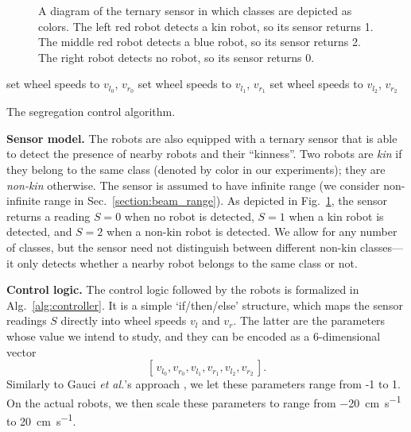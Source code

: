 \documentclass[conference]{IEEEtran}
\newcommand{\myparagraph}[1]{\textbf{#1.}}
\begin{document}
\newcommand{\robot}[2]{%
  \filldraw[draw=#2,fill=#2!20] (#1) circle(5mm);
  \draw[draw=#2,->,-Stealth,rotate around={0:(#1)}] (#1) -- +(5mm,0);
  \fill[fill=gray!20] ($(#1)+(5mm,0)$) -- +( 45:1cm) -- +(-45:1cm) -- cycle;%
  \fill[fill=#2] ($(#1)+(5mm,0)$) circle (1mm);%
}
\begin{figure}[t]
  \centering
  \caption{A diagram of the ternary sensor in which classes are depicted
    as colors. The left red robot detects a kin robot, so its sensor
    returns 1. The middle red robot detects a blue robot, so its sensor
    returns 2. The right robot detects no robot, so its sensor returns
    0.}
  \label{fig:sensor}
\end{figure}
\begin{algorithm}[t]
  \begin{algorithmic}
     \State set wheel speeds to $v_{l_0}$, $v_{r_0}$
     \State set wheel speeds to $v_{l_1}$, $v_{r_1}$
    \Else \State set wheel speeds to $v_{l_2}$, $v_{r_2}$
    \EndIf
  \end{algorithmic}
  \caption{The segregation control algorithm.}
  \label{alg:controller}
\end{algorithm}

\myparagraph{Sensor model}
The robots are also equipped with a ternary sensor that is able to detect the
presence of nearby robots and their ``kinness''. Two robots are \emph{kin} if
they belong to the same class (denoted by color in our experiments); they are
\emph{non-kin} otherwise. The sensor is assumed to have infinite range (we
consider non-infinite range in Sec.~\ref{section:beam_range}). As depicted in
Fig.~\ref{fig:sensor}, the sensor returns a reading $S=0$ when no robot is
detected, $S=1$ when a kin robot is detected, and $S=2$ when a non-kin robot is
detected. We allow for any number of classes, but the sensor need not
distinguish between different non-kin classes---it only detects whether a nearby
robot belongs to the same class or not.

\myparagraph{Control logic}
The control logic followed by the robots is formalized in
Alg.~\ref{alg:controller}. It is a simple `if/then/else' structure, which maps
the sensor readings $S$ directly into wheel speeds $v_l$ and $v_r$. The latter
are the parameters whose value we intend to study, and they can be encoded as a
6-dimensional vector
$$
[\,v_{l_0}, v_{r_0}, v_{l_1}, v_{r_1}, v_{l_2}, v_{r_2}\,].
$$
Similarly to Gauci \emph{et al.}'s approach \cite{gauci_self-organized_2014}, we
let these parameters range from -1 to 1. On the actual robots, we then scale
these parameters to range from \SI{-20}{\centi\meter\per\second} to
\SI{20}{\centi\meter\per\second}.
\end{document}
